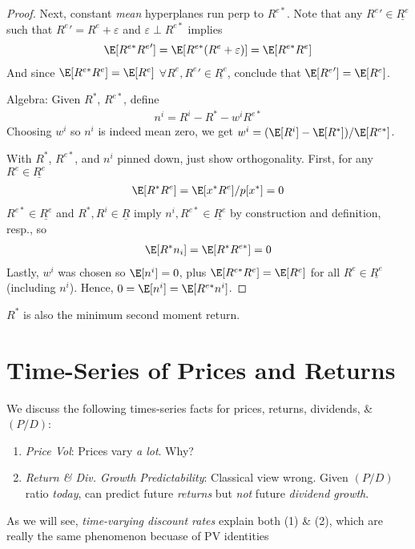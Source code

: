 \documentclass[12pt]{article}
\theoremstyle{plain}
\theoremstyle{definition}
\theoremstyle{remark}
\begin{document}
\begin{multicols*}{2}
\begin{proof}
Next, constant \emph{mean} hyperplanes run perp to $R^{e*}$.
Note that any ${R^{e}}'\in\underline{R^e}$ such that
${R^{e}}'=R^e+\varepsilon$ and $\varepsilon\perp R^{e*}$
implies
\begin{align*}
  \E[R^{e*}{R^{e}}']
  =
  \E[R^{e*}(R^{e}+\varepsilon)]
  = \E[R^{e*}R^e]
\end{align*}
And since $\E[R^{e*}R^e]=\E[R^e]$
$\forall R^e,{R^e}'\in\underline{R^e}$, conclude that
$\E[{R^{e}}']=\E[R^{e}]$.

Algebra:
Given $R^*$, $R^{e*}$, define
\begin{align*}
  n^i = R^i - R^* -w^i R^{e*}
\end{align*}
Choosing $w^i$ so $n^i$ is indeed mean zero, we get
$w^i = (\E[R^i] - \E[R^*])/\E[R^{e*}]$.

With $R^*$, $R^{e*}$, and $n^i$ pinned down, just show orthogonality.
First, for any $R^e\in\underline{R^e}$
\begin{align*}
  \E[R^*R^e]=\E[x^*R^e]/p[x^*]=0
\end{align*}
$R^{e*}\in\underline{R^e}$ and $R^*,R^i\in\underline{R}$
imply $n^i,R^{e*}\in\underline{R^e}$ by construction and definition,
resp., so
\begin{align*}
  \E[R^*n_i]=\E[R^*R^{e*}]=0
\end{align*}
Lastly, $w^i$ was chosen so $\E[n^i]=0$, plus
$\E[R^{e*}R^e]=\E[R^e]$ for all $R^e\in\underline{R^e}$ (including
$n^i$). Hence, $0=\E[n^i] =\E[R^{e*}n^i]$.
\end{proof}

\clearpage
$R^*$ is also the minimum second moment return.


\clearpage
\section{Time-Series of Prices and Returns}

We discuss the following times-series facts for prices,
returns, dividends, \& $(P/D)$:
\begin{enumerate}
  \item \emph{Price Vol}: Prices vary \emph{a lot}. Why?
  \item \emph{Return \& Div. Growth Predictability}:
    Classical view wrong.
    Given $(P/D)$ ratio \emph{today}, can predict future \emph{returns}
    but \emph{not} future \emph{dividend growth}.
\end{enumerate}
As we will see, \emph{time-varying discount rates} explain both (1) \&
(2), which are really the same phenomenon becuase of PV identities


\end{multicols*}
\end{document}
